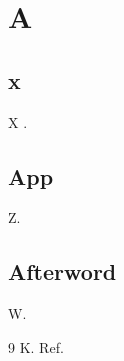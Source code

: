 \documentclass{amsbook}
\begin{document}
\part{A}
\chapter{x}
X \cite{k}.
\appendix
\chapter{App}
Z.
\backmatter
\chapter{Afterword}
W.
\begin{thebibliography}{9}
 K. Ref.
\end{thebibliography}
\end{document}

